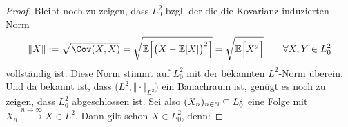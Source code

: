\documentclass[12pt,a4paper]{article}
\begin{document}
\begin{proof}
Bleibt noch zu zeigen, dass $L_0^2$ bzgl. der die die Kovarianz induzierten Norm
\begin{align*}
\Vert X\Vert:=\sqrt{\Cov(X,X)}
=\sqrt{\E\Big[\big(X-\E[X]\big)^2\Big]}
=\sqrt{\E\Big[X^2\Big]}
\qquad\forall X,Y\in L_0^2
\end{align*}
vollständig ist. Diese Norm stimmt auf $L_0^2$ mit der bekannten $L^2$-Norm überein. Und da bekannt ist, dass $\big(L^2,\Vert\cdot\Vert_{L^2}\big)$ ein Banachraum ist, genügt es noch zu zeigen, dass $L_0^2$ abgeschlossen ist.
Sei also $(X_n)_{n\in\mathbb{N}}\subseteq L_0^2$ eine Folge mit
$X_n\stackrel{n\to\infty}{\longrightarrow}X\in L^2$.
Dann gilt schon $X\in L_0^2$, denn:


\end{proof}
\end{document}
